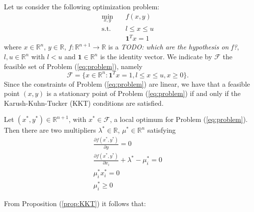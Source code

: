 Let us consider the following optimization problem:
\begin{subequations}\label{eq:problem} 
\begin{align}
\min_{x,y} & \quad f(x,y)  \\
\text{s.t.} & \quad l \leq x \leq u \\
& \quad \mathbf{1}^T x = 1 
\end{align}
\end{subequations}
where $x \in \mathbb{R}^n$, $y \in \mathbb{R}$, $f:\mathbb{R}^{n+1} \rightarrow \mathbb{R}$ is a \textit{TODO: which are the hypothesis on f?}, $l, u \in \mathbb{R}^n$ with $l < u$ and $\mathbf{1} \in \mathbb{R}^n$ is the identity vector. We indicate by $\mathcal{F}$ the feasible set of Problem (\ref{eq:problem}), namely
\begin{equation}
\mathcal{F} = \{x \in \mathbb{R}^n : \mathbf{1}^T x = 1, l \leq x \leq u, x \geq 0 \}.
\end{equation}
Since the constraints of Problem (\ref{eq:problem}) are linear, we have that a feasible point $(x,y)$ is a stationary point of Problem (\ref{eq:problem}) if and only if the Karush-Kuhn-Tucker (KKT) conditions are satisfied.

\begin{proposition}\label{prop:KKT}
Let $(x^*,y^*) \in \mathbb{R}^{n+1}$, with $x^* \in \mathcal{F}$, a local optimum for Problem (\ref{eq:problem}). Then there are two multipliers $\lambda^* \in \mathbb{R}$, $\mu^* \in \mathbb{R}^n$ satisfying
\begin{subequations}
\begin{align}
\frac{\partial f(x^*, y^*)}{\partial y} = 0 \\
\frac{\partial f(x^*, y^*)}{\partial x_i} +\lambda^* - \mu^*_i =0 \\
\mu^*_ix^{*}_i=0 \\
\mu^*_i\ge0
\end{align}
\end{subequations}
\end{proposition}

\hspace{-1.8em} From Proposition (\ref{prop:KKT}) it follows that:

